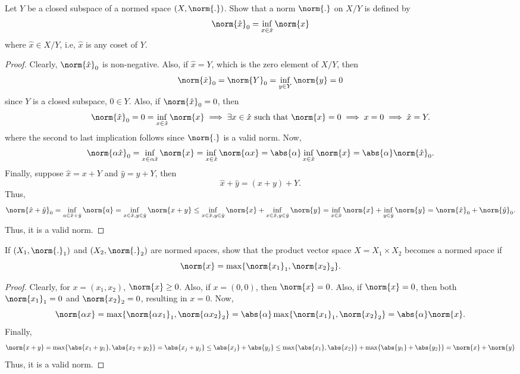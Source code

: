 \begin{question}
    Let $Y$ be a closed subspace of a normed space $(X , \norm{.})$. Show that a norm $\norm{.}$ on $X/Y$ is defined by 
    \[\norm{\hat{x}}_0 = \inf_{x \in \hat{x}} \norm{x}\]
    where $\hat{x} \in X/Y$, i.e, $\hat{x}$ is any coset of $Y$.
    \label{section2.3-14}
\end{question}
\begin{proof}
    Clearly, $\norm{\hat{x}}_0$ is non-negative. Also, if $\hat{x} = Y$, which is the zero element of $X/Y$, then
    \[\norm{\hat{x}}_0 = \norm{Y}_0 = \inf_{y \in Y} \norm{y} = 0\]
    since $Y$ is a closed subspace, $0 \in Y$. Also, if $\norm{\hat{x}}_0 = 0$, then
    \[\norm{\hat{x}}_0 = 0 = \inf_{x \in \hat{x}} \norm{x} \implies \exists x \in \hat{x} \text{ such that } \norm{x} = 0 \implies x = 0 \implies \hat{x} = Y.\]
    where the second to last implication follows since $\norm{.}$ is a valid norm. Now, 
    \[\norm{\alpha \hat{x}}_0 = \inf_{x \in \alpha \hat{x}} \norm{x} = \inf_{x \in \hat{x}} \norm{\alpha x} = \abs{\alpha} \inf_{x \in \hat{x}} \norm{x} = \abs{\alpha} \norm{\hat{x}}_0.\]
    Finally, suppose $\hat{x} = x + Y$ and $\hat{y} = y + Y$, then
    \[\hat{x} + \hat{y} = (x+y) + Y.\]
    Thus, 
    \[\norm{\hat{x} + \hat{y}}_0 = \inf_{a \in \hat{x} + \hat{y}} \norm{a} = \inf_{x \in \hat{x} , y \in \hat{y}} \norm{x + y} \leq \inf_{x \in \hat{x} , y \in \hat{y}} \norm{x} + \inf_{x \in \hat{x} , y \in \hat{y}} \norm{y} = \inf_{x \in \hat{x}} \norm{x} + \inf_{y \in \hat{y}} \norm{y} = \norm{\hat{x}}_0 + \norm{\hat{y}}_0.\]
   Thus, it is a valid norm.
\end{proof}

\begin{question}
    If $(X_1 , \norm{.}_1)$ and $(X_2 , \norm{.}_2)$ are normed spaces, show that the product vector space $X = X_1 \times X_2$ becomes a normed space if
    \[\norm{x} = \max\{\norm{x_1}_1 , \norm{x_2}_2\}.\]
    \label{section2.3-15}
\end{question}
\begin{proof}
    Clearly, for $x = (x_1 , x_2)$, $\norm{x} \geq 0$. Also, if $x = (0,0)$, then $\norm{x} = 0$. Also, if $\norm{x} = 0$, then both $\norm{x_1}_1 = 0$ and $\norm{x_2}_2 = 0$, resulting in $x = 0$. Now, 
    \[\norm{\alpha x} = \max\{\norm{\alpha x_1}_1 , \norm{\alpha x_2}_2\} = \abs{\alpha} \max\{\norm{x_1}_1 , \norm{x_2}_2\} = \abs{\alpha} \norm{x}.\]
    Finally, 
    \[\norm{x + y} = \max\{\abs{x_1 + y_1} , \abs{x_2 + y_2}\} = \abs{x_j + y_j} \leq \abs{x_j} + \abs{y_j} \leq \max\{\abs{x_1} , \abs{x_2}\} + \max\{\abs{y_1} + \abs{y_2}\} = \norm{x} + \norm{y}\]
    Thus, it is a valid norm.
\end{proof}